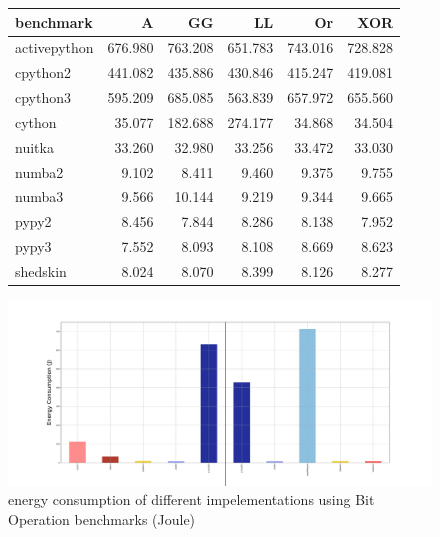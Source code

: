 \begin{figure}

    \label{table:bitops}
    \begin{tabular}{|lrrrrr|}
        \toprule
        benchmark    & A       & GG      & LL      & Or      & XOR     \\
        \midrule
        activepython & 676.980 & 763.208 & 651.783 & 743.016 & 728.828 \\
        cpython2     & 441.082 & 435.886 & 430.846 & 415.247 & 419.081 \\
        cpython3     & 595.209 & 685.085 & 563.839 & 657.972 & 655.560 \\
        cython       & 35.077  & 182.688 & 274.177 & 34.868  & 34.504  \\
        nuitka       & 33.260  & 32.980  & 33.256  & 33.472  & 33.030  \\
        numba2       & 9.102   & 8.411   & 9.460   & 9.375   & 9.755   \\
        numba3       & 9.566   & 10.144  & 9.219   & 9.344   & 9.665   \\
        pypy2        & 8.456   & 7.844   & 8.286   & 8.138   & 7.952   \\
        pypy3        & 7.552   & 8.093   & 8.108   & 8.669   & 8.623   \\
        shedskin     & 8.024   & 8.070   & 8.399   & 8.126   & 8.277   \\
        \bottomrule
    \end{tabular}
    \vfill
    \centering
    \includegraphics[width=\linewidth]{imgs/bitopts_mean}
    \caption{energy consumption of different impelementations using Bit Operation benchmarks (Joule) }
\end{figure}



